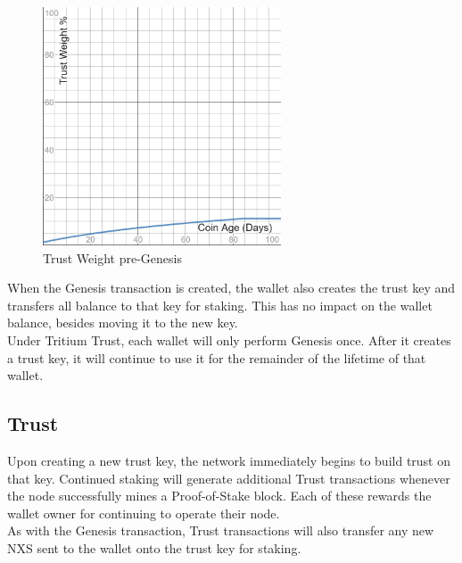 \documentclass[11pt]{article}
\begin{document}
\begin{figure}[h!]
    \centering
    \includegraphics[width=0.63\textwidth]{images/preGenesisTrustWeight.png}
    \caption{Trust Weight pre-Genesis \label{fig:preGenesisTrust}}
\end{figure}

\noindent When the Genesis transaction is created, the wallet also creates the trust key and transfers all balance to that key for staking. This has no impact on the wallet balance, besides moving it to the new key.\\

\noindent Under Tritium Trust, each wallet will only perform Genesis once. After it creates a trust key, it will continue to use it for the remainder of the lifetime of that wallet.\\

\subsection{Trust}
Upon creating a new trust key, the network immediately begins to build trust on that key. Continued staking will generate additional Trust transactions whenever the node successfully mines a Proof-of-Stake block. Each of these rewards the wallet owner for continuing to operate their node.\\

\noindent As with the Genesis transaction, Trust transactions will also transfer any new NXS sent to the wallet onto the trust key for staking. \\
\end{document}
